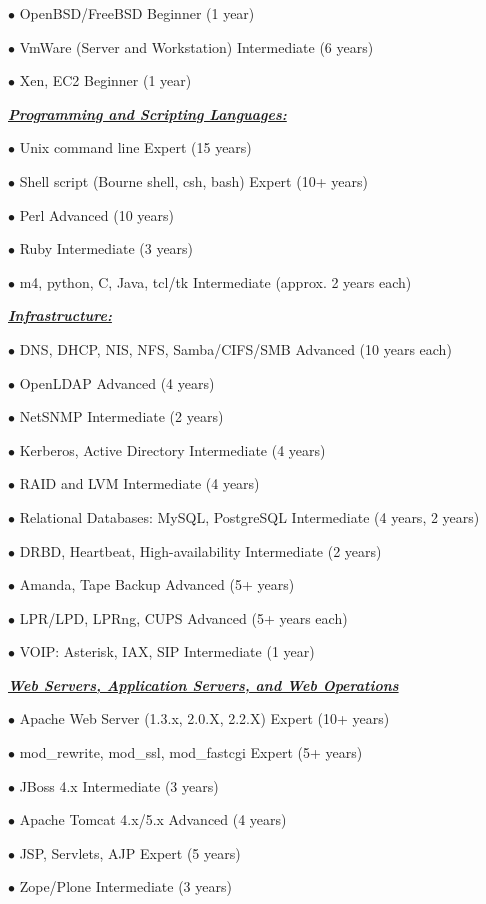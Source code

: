 \documentclass{article}
\newcommand{\skillset}[1]{{ \underline{\textbf{\emph{#1}}}\\  \nopagebreak }}
\newcommand{\skill}[2]{{$\bullet$ #1 \hfill #2 }}
\begin{document}
\skill{OpenBSD/FreeBSD}{Beginner (1 year)}

\skill{VmWare (Server and Workstation)}{Intermediate (6 years)}

\skill{Xen, EC2}{Beginner (1 year)}



\skillset{Programming and Scripting Languages: }

\skill{Unix command line}{Expert (15 years)}

\skill{Shell script (Bourne shell, csh, bash)}{Expert (10+ years)}

\skill{Perl}{Advanced (10 years)}

\skill{Ruby}{Intermediate (3 years)}

\skill{m4, python, C, Java, tcl/tk}{Intermediate (approx. 2 years each)}



\skillset{Infrastructure: }

\skill{DNS, DHCP, NIS, NFS, Samba/CIFS/SMB}{Advanced (10 years each)}

\skill{OpenLDAP}{Advanced (4 years)}

\skill{NetSNMP}{Intermediate (2 years)}

\skill{Kerberos, Active Directory}{Intermediate (4 years)}

\skill{RAID and LVM}{Intermediate (4 years)}

\skill{Relational Databases: MySQL, PostgreSQL}{Intermediate (4 years, 2 years)}

\skill{DRBD, Heartbeat, High-availability}{Intermediate (2 years)}

\skill{Amanda, Tape Backup}{Advanced (5+ years)}

\skill{LPR/LPD, LPRng, CUPS}{Advanced (5+ years each)}

\skill{VOIP: Asterisk, IAX, SIP}{Intermediate (1 year)}



\skillset{Web Servers, Application Servers, and Web Operations}

\skill{Apache Web Server (1.3.x, 2.0.X, 2.2.X)}{Expert (10+ years)}

\skill{mod\_rewrite, mod\_ssl, mod\_fastcgi}{Expert (5+ years)}

\skill{JBoss 4.x}{Intermediate (3 years)}

\skill{Apache Tomcat 4.x/5.x}{Advanced (4 years)}

\skill{JSP, Servlets, AJP}{Expert (5 years)}

\skill{Zope/Plone}{Intermediate (3 years)}
\end{document}
